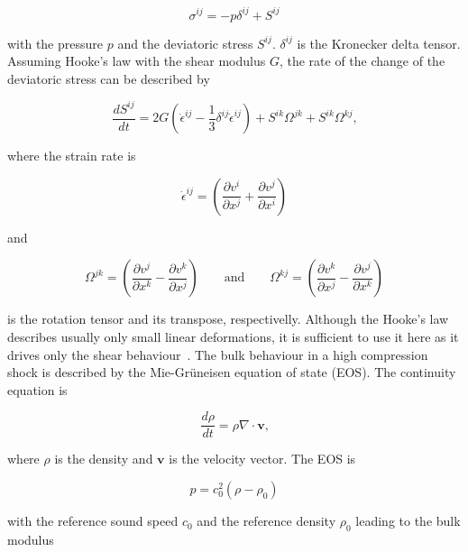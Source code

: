 \documentclass{svproc}
\newcommand{\reva}[1]{{\color{black}#1}}
\newcommand{\revb}[1]{{\color{black}#1}}
\begin{document}
\begin{equation}
\sigma^{ij}=-p\delta^{ij}+S^{ij}
\end{equation}

\noindent
with the pressure $p$ and the deviatoric stress $S^{ij}$. $\delta^{ij}$ is the Kronecker delta tensor. Assuming Hooke's law with the shear modulus $G$, the rate of the change of the deviatoric stress can be described by

\begin{equation}
\label{eq:eomeq}
\frac{dS^{ij}}{dt}=2G\left(\dot\epsilon^{ij}-\frac{1}{3}\delta^{ij}\dot\epsilon^{ij}\right)+S^{ik}\Omega^{jk}+S^{ik}\Omega^{kj}
\mbox{,}
\end{equation}

\noindent
where the strain rate is

\begin{equation}
\dot\epsilon^{ij}=\left(\frac{\partial v^i}{\partial x^j}+\frac{\partial v^j}{\partial x^i}\right)
\end{equation}

\noindent
and

\revb{
\begin{equation}
\Omega^{jk}=\left(\frac{\partial v^j}{\partial x^k}-\frac{\partial v^k}{\partial x^j}\right)
\qquad\mbox{and}\qquad
\Omega^{kj}=\left(\frac{\partial v^k}{\partial x^j}-\frac{\partial v^j}{\partial x^k}\right)
\end{equation}
}

\noindent
is the rotation tensor \revb{and its transpose, respectivelly}. \reva{Although the Hooke’s law describes usually only small linear deformations, it is sufficient to use it here as it drives only the shear behaviour~\cite{Awoukeng:2014}. The bulk behaviour in a high compression shock is described by the Mie-Gr\"uneisen equation of state (EOS).} The continuity equation is

\begin{equation}
\label{eq:conteq}
\frac{d\rho}{dt}=\rho\nabla\cdot{\bm v}
\mbox{,}
\end{equation}

\noindent
where $\rho$ is the density and ${\bm v}$ is the velocity vector. The EOS is

\begin{equation}
p=c_0^2(\rho-\rho_0)
\end{equation}

\noindent
with the reference sound speed $c_0$ and the reference density $\rho_0$ leading to the bulk modulus
\end{document}
